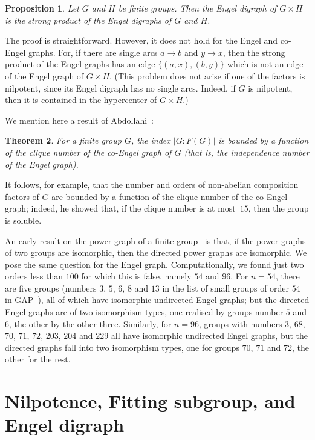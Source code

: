 \documentclass[reqno,12pt]{amsart}
\theoremstyle{plain}
\newtheorem{thm}{Theorem}[section]
\newtheorem{prop}[thm]{Proposition}
\theoremstyle{definition}
\begin{document}
\begin{prop}
Let $G$ and $H$ be finite groups. Then the Engel digraph of $G\times H$
is the strong product of the Engel digraphs of $G$ and $H$.
\end{prop}

The proof is straightforward. However, it does not hold for the Engel and
co-Engel graphs. For, if there are single arcs $a\to b$ and $y\to x$, then
the strong product of the Engel graphs has an edge $\{(a,x),(b,y)\}$ which
is not an edge of the Engel graph of $G\times H$. (This problem does not arise
if one of the factors is nilpotent, since its Engel digraph has no single
arcs. Indeed, if $G$ is nilpotent, then it is contained in the hypercenter
of $G\times H$.)

\medskip

We mention here a result of Abdollahi~\cite{aa1}:

\begin{thm}
For a finite group $G$, the index $|G:F(G)|$ is bounded by a function of the
clique number of the co-Engel graph of $G$ (that is, the independence number
of the Engel graph).
\end{thm}

It follows, for example, that the number and orders of non-abelian composition
factors of $G$ are bounded by a function of the clique number of the
co-Engel graph; indeed, he showed that, if the clique number is at most~$15$,
then the group is soluble.

An early result on the power graph of a finite group~\cite{Cameron:pg}  is
that, if the power graphs of two groups are isomorphic, then the directed power
graphs are isomorphic. We pose the same question for the Engel graph.
Computationally, we found just two orders less than $100$ for which this is
false, namely $54$ and $96$. For $n=54$, there are five groups (numbers $3$,
$5$, $6$, $8$ and $13$ in the list of small groups of order $54$ in
\textsf{GAP}~\cite{gap}), all of which have isomorphic undirected Engel graphs;
 but the directed Engel graphs are of two isomorphism types, one realised by
groups number $5$ and $6$, the other by the other three. Similarly, for $n=96$,
 groups with numbers $3$, $68$, $70$, $71$, $72$, $203$, $204$ and $229$ all
have isomorphic undirected Engel graphs, but the directed graphs fall into two
isomorphism types, one for groups $70$, $71$ and $72$, the other for the rest.

\section{Nilpotence, Fitting subgroup, and Engel digraph}
\label{s:NFE}
\end{document}
